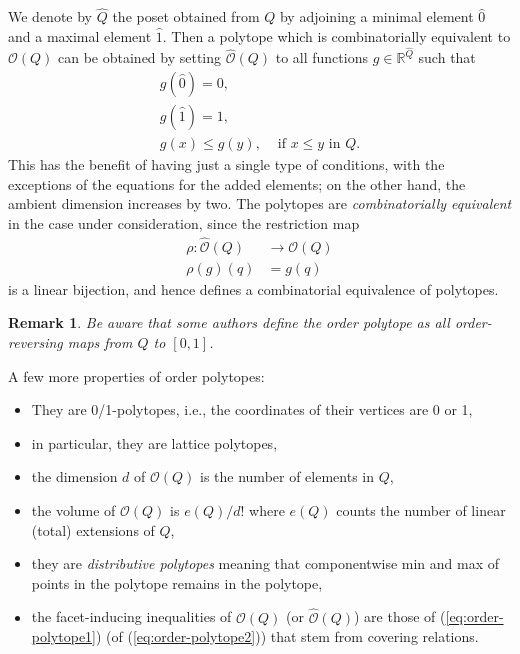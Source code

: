 \documentclass[11pt,a4paper,abstract=yes]{scrartcl}
\theoremstyle{plain}
\newtheorem{remark}[theorem]{Remark}
\newcommand{\RR}{\mathbb{R}}
\newcommand{\orderpolytope}[1]{\mathcal{O}({#1})}
\newcommand{\orderpolytopebounds}[1]{\widehat{\mathcal{O}}({#1})}
\begin{document}
We denote by \(\hat{Q}\) the poset obtained from \(Q\) by
adjoining a minimal element \(\hat{0}\) and a maximal element \(\hat{1}\).
Then a polytope which is combinatorially equivalent to \(\orderpolytope{Q}\) can be obtained by setting \(\orderpolytopebounds{Q}\)
to all functions \(g \in \RR^{\hat{Q}}\) such that
\begin{align}
\label{eq:order-polytope3}
  g(\hat{0}) = 0, \\
  g(\hat{1}) = 1, \\
  g(x) \le g(y), & \text{ if } x \le y \text{ in } Q.
\end{align}
This has the benefit of having just a single type of conditions, with the exceptions of the equations for the
added elements; on the other hand, the ambient dimension increases by two.
The polytopes are \emph{combinatorially equivalent}
in the case under consideration, since the restriction map
\begin{align*}
\rho: \orderpolytopebounds{Q} & \to \orderpolytope{Q} \\
\rho(g)(q) & = g(q)
\end{align*}
is a linear bijection, and hence defines a combinatorial equivalence of polytopes.

\begin{remark}
Be aware that some authors define the order polytope as all \emph{order-reversing} maps
from \(Q\) to \([0,1]\).
\end{remark}

A few more properties of order polytopes:
\begin{itemize}
\item They are 0/1-polytopes, i.e., the coordinates of their vertices are 0 or 1,
\item in particular, they are lattice polytopes,
\item the dimension \(d\) of \(\orderpolytope{Q}\) is the number of elements in \(Q\),
\item the volume of \(\orderpolytope{Q}\) is \(e(Q)/d!\) where \(e(Q)\) counts the number of linear (total)
extensions of \(Q\),
\item they are \emph{distributive polytopes} meaning that componentwise min and max of points in the polytope
remains in the polytope,
\item the facet-inducing inequalities of \(\orderpolytope{Q}\) (or \(\orderpolytopebounds{Q}\)) are those
of (\ref{eq:order-polytope1}) (of (\ref{eq:order-polytope2})) that stem from covering relations.
\end{itemize}
\end{document}
